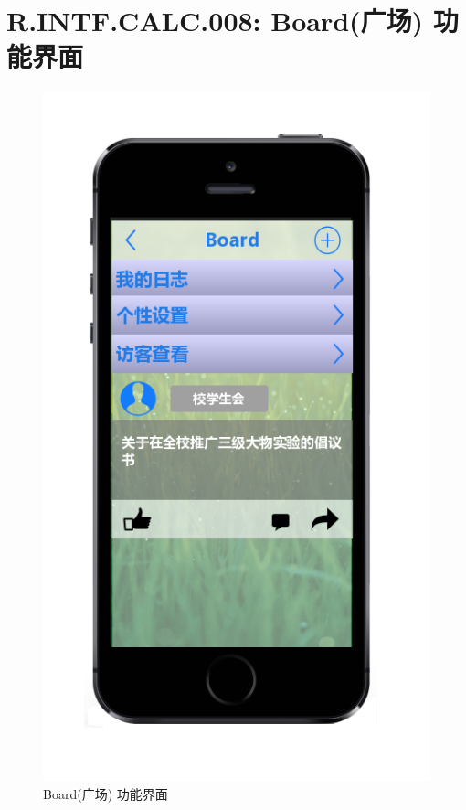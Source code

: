     \section{R.INTF.CALC.008: Board(广场) 功能界面}
    \begin{figure}[h]
        \centering
        \includegraphics[scale=0.6]{OutlineDesign/figures/Board广场功能界面.png}
        \caption{Board(广场) 功能界面}
        \label{fig:server_flow}
    \end{figure}
    \newpage
